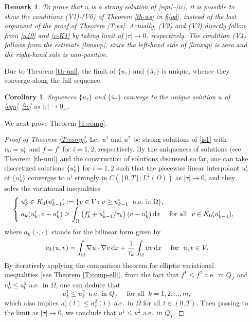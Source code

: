 \documentclass[reqno,10pt]{amsart}
\newtheorem{Cor}[Th]{Corollary}
\newtheorem{Rem}[Th]{Remark}
\begin{document}
\begin{Rem}
{\rm
To prove that $u$ is a strong solution of \eqref{eqn}--\eqref{ic},
it is possible to show the conditions (V1)-(V6) of Theorem \ref{th-ws}
 in \S \ref{od},
instead of the last argument of the proof of Theorem \ref{T:ex}.
Actually, (V2) and (V3) directly follow from \eqref{n40} and \eqref{c-K1}
by taking limit of $|\tau |\to 0$, respectively.
The condition (V4) follows from the estimate \eqref{limsup},
since the left-hand side of \eqref{limsup} is zero
and the right-hand side is non-positive.
}
\end{Rem}

Due to Theorem \ref{th-uni}, the limit of $\{u_\tau\}$ and $\{\bar
u_\tau\}$ is unique, whence they converge along the full sequence.
\begin{Cor}
Sequences $\{u_\tau\}$ and $\{\bar u_\tau\}$ converge to the unique
 solution $u$ of \eqref{eqn}--\eqref{ic} as $|\tau| \to 0_+$.
\end{Cor}

We next prove Theorem \ref{T:comp}.

\begin{proof}[Proof of Theorem \ref{T:comp}]
 Let $u^1$ and $u^2$ be strong solutions of \eqref{is1} with $u_0 =
 u_0^i$ and $f = f^i$ for $i = 1,2$, respectively. By the uniqueness of solutions (see
 Theorem \ref{th-uni}) and the construction of solutions discussed so
 far, one can take discretized solutions $\{u_k^i\}$ for $i = 1,2$ such that
 the piecewise linear interpolant $u_\tau^i$ of $\{u_k^i\}$ converges to
 $u^i$ strongly in $C([0,T];L^2(\Omega))$ as $|\tau| \to 0$, and they
 solve the variational inequalities
$$
\begin{cases}
\ \displaystyle u_k^i \in K_0(u_{k-1}^i) 
 := \{ v \in V
 \colon v \geq u_{k-1}^i \ \mbox{ a.e.~in } \Omega\},\\
\ \displaystyle a_k(u_k^i , v-u_k^i) 
 \geq \int_\Omega \left( f_k^i + u_{k-1}^i/\tau_k \right) (v - u_k^i) \,
 {\text{\rm d}} x \quad \mbox{ for all } \  v \in K_0(u_{k-1}^i),
\end{cases}
$$
where $a_k(\cdot,\cdot)$ stands for the bilinear form given by
$$
a_k(u,v) = \int_\Omega \nabla u \cdot \nabla v \,{\text{\rm d}} x 
 + \dfrac 1 {\tau_k} \int_\Omega u v \,{\text{\rm d}} x
\quad \mbox{ for } \ u, v \in V.
$$
By iteratively applying the comparison theorem for
 elliptic variational inequalities (see Theorem \ref{T:comp-ell}), from
 the fact that $f^1 \leq f^2$ a.e.~in $Q_T$ and $u_0^1 \leq u_0^2$
 a.e.~in $\Omega$, one can deduce that
$$
 u_k^1 \leq u_k^2 \ \mbox{ a.e.~in } Q_T 
\quad \mbox{ for all } \ k = 1,2,\ldots,m,
$$
which also implies $u^1_\tau(t) \leq u^2_\tau(t)$ a.e.~in $\Omega$ for
 all $t \in (0,T)$. Then passing to the limit as $|\tau| \to 0$, we
 conclude that $u^1 \leq u^2$ a.e.~in $Q_T$.
\end{proof}
\end{document}
